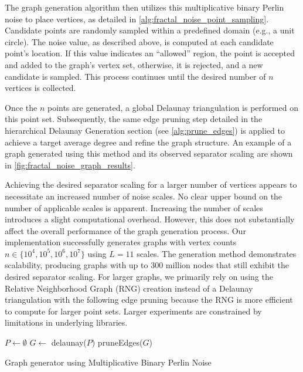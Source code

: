 The graph generation algorithm then utilizes this multiplicative binary Perlin noise to place vertices, as detailed in \cref{alg:fractal_noise_point_sampling}.
Candidate points are randomly sampled within a predefined domain (e.g., a unit circle).
The noise value, as described above, is computed at each candidate point's location.
If this value indicates an \enquote{allowed} region, the point is accepted and added to the graph's vertex set,
otherwise, it is rejected, and a new candidate is sampled.
This process continues until the desired number of \(n\) vertices is collected.

Once the \(n\) points are generated, a global Delaunay triangulation is performed on this point set.
Subsequently, the same edge pruning step detailed in the hierarchical Delaunay Generation section (see \cref{alg:prune_edges}) is applied to achieve a target average degree and refine the graph structure.
An example of a graph generated using this method and its observed separator scaling are shown in \cref{fig:fractal_noise_graph_results}.

Achieving the desired separator scaling for a larger number of vertices appears to necessitate an increased number of noise scales.
No clear upper bound on the number of applicable scales is apparent.
Increasing the number of scales introduces a slight computational overhead.
However, this does not substantially affect the overall performance of the graph generation process.
Our implementation successfully generates graphs with vertex counts \(n \in \{10^4, 10^5, 10^6, 10^7\}\) using \(L=11\) scales.
The generation method demonstrates scalability, producing graphs with up to 300 million nodes that still exhibit the desired separator scaling.
For larger graphs, we primarily rely on using the Relative Neighborhood Graph (RNG) creation instead of a Delaunay triangulation with the following edge pruning because the RNG is more efficient to compute for larger point sets.
Larger experiments are constrained by limitations in underlying libraries.

\begin{algorithm}[tbhp]
	\BlankLine
	\(P \longleftarrow \emptyset\)\;
	\(G \longleftarrow\) delaunay(\(P\))\;
	pruneEdges(\(G\))\;
	\;
	\caption{Graph generator using Multiplicative Binary Perlin Noise}
	\label{alg:fractal_noise_point_sampling}
\end{algorithm}

